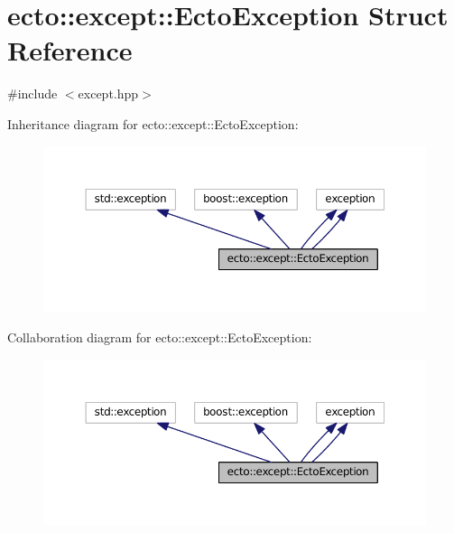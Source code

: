 \hypertarget{structecto_1_1except_1_1EctoException}{\section{ecto\-:\-:except\-:\-:Ecto\-Exception Struct Reference}
\label{structecto_1_1except_1_1EctoException}
}


{\ttfamily \#include $<$except.\-hpp$>$}



Inheritance diagram for ecto\-:\-:except\-:\-:Ecto\-Exception\-:\nopagebreak
\begin{figure}[H]
\begin{center}
\leavevmode
\includegraphics[width=350pt]{structecto_1_1except_1_1EctoException__inherit__graph}
\end{center}
\end{figure}


Collaboration diagram for ecto\-:\-:except\-:\-:Ecto\-Exception\-:\nopagebreak
\begin{figure}[H]
\begin{center}
\leavevmode
\includegraphics[width=350pt]{structecto_1_1except_1_1EctoException__coll__graph}
\end{center}
\end{figure}
